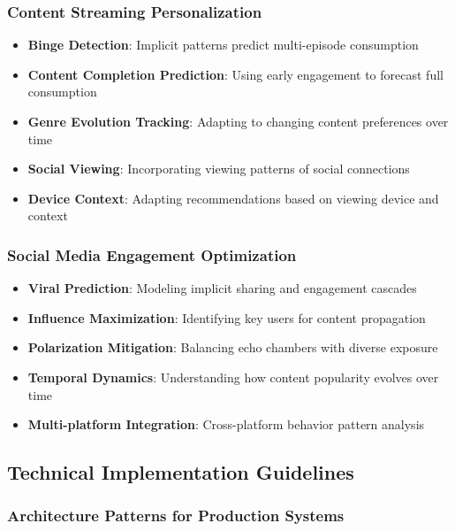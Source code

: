 \documentclass[acmsmall,review,anonymous]{acmart}
\begin{document}
\subsubsection{Content Streaming Personalization}

\begin{itemize}
    \item \textbf{Binge Detection}: Implicit patterns predict multi-episode consumption
    \item \textbf{Content Completion Prediction}: Using early engagement to forecast full consumption
    \item \textbf{Genre Evolution Tracking}: Adapting to changing content preferences over time
    \item \textbf{Social Viewing}: Incorporating viewing patterns of social connections
    \item \textbf{Device Context}: Adapting recommendations based on viewing device and context
\end{itemize}

\subsubsection{Social Media Engagement Optimization}

\begin{itemize}
    \item \textbf{Viral Prediction}: Modeling implicit sharing and engagement cascades
    \item \textbf{Influence Maximization}: Identifying key users for content propagation
    \item \textbf{Polarization Mitigation}: Balancing echo chambers with diverse exposure
    \item \textbf{Temporal Dynamics}: Understanding how content popularity evolves over time
    \item \textbf{Multi-platform Integration}: Cross-platform behavior pattern analysis
\end{itemize}

\subsection{Technical Implementation Guidelines}

\subsubsection{Architecture Patterns for Production Systems}
\end{document}
